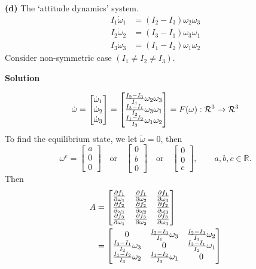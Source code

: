 \documentclass[12pt,a4paper]{article}
\begin{document}
\par\vspace{1.8cm}

\textbf{(d)} The `attitude dynamics' system.
\[
\begin{aligned}
I_1\dot\omega_1 &= (I_2-I_3)\omega_2\omega_3\\
I_2\dot\omega_2 &= (I_3-I_1)\omega_3\omega_1\\
I_3\dot\omega_3 &= (I_1-I_2)\omega_1\omega_2
\end{aligned}
\]
Consider non-symmetric case $(I_1\neq I_2\neq I_3)$.

\textbf{Solution}


\[
\dot \omega = \begin{bmatrix}
	\dot \omega_1 \\ \dot \omega_2 \\ \dot \omega_3
\end{bmatrix} = \begin{bmatrix}
	{I_2 - I_3 \over I_1} \omega_2 \omega_3 \\
	{I_3 - I_1 \over I_2} \omega_3 \omega_1  \\
	{I_1 - I_2 \over I_3} \omega_1 \omega_2
\end{bmatrix} = F(\omega): \mathcal R^3 \to \mathcal R^3
\]
To find the equilibrium state, we let $\dot \omega = 0$, then
\[
\omega^e =
\begin{bmatrix} a \\ 0 \\ 0 \end{bmatrix}
\quad\text{or}\quad
\begin{bmatrix} 0 \\ b \\0  \end{bmatrix}
\quad\text{or}\quad
\begin{bmatrix} 0 \\ 0\\ c \end{bmatrix},
\qquad a,b,c\in\mathbb R.
\]
Then
\begin{align*}
	A &= \begin{bmatrix}
		{\partial f_1 \over\partial \omega_1} & {\partial f_1 \over\partial \omega_2} & {\partial f_1 \over\partial \omega_3} \\
		{\partial f_2 \over\partial \omega_1} & {\partial f_2 \over\partial \omega_2} & {\partial f_2 \over\partial \omega_3} \\
		{\partial f_3 \over\partial \omega_1} & {\partial f_3 \over\partial \omega_2} & {\partial f_3 \over\partial \omega_3} \\
			\end{bmatrix} \\
	&= \begin{bmatrix}
		0 & 	{I_2 - I_3 \over I_1} \omega_3 & 	{I_2 - I_3 \over I_1} \omega_2 \\
		{I_3 - I_1 \over I_2}\omega_3 & 0 & {I_3 - I_1 \over I_2} \omega_1 \\
		{I_1 - I_2 \over I_3} \omega_2 & {I_1 - I_2\over I_3} \omega_1 &  0 \\
	\end{bmatrix}
\end{align*}
\end{document}
